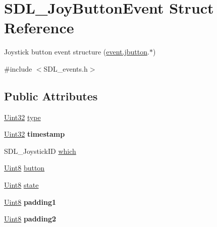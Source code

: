 \hypertarget{structSDL__JoyButtonEvent}{}\section{S\+D\+L\+\_\+\+Joy\+Button\+Event Struct Reference}
\label{structSDL__JoyButtonEvent}


Joystick button event structure (\hyperlink{unionSDL__Event_a591104d64903ae1cf70874fb5d3124ff}{event.\+jbutton}.$\ast$)  




{\ttfamily \#include $<$S\+D\+L\+\_\+events.\+h$>$}

\subsection*{Public Attributes}
\begin{DoxyCompactItemize}
\item 
\hyperlink{SDL__stdinc_8h_add440eff171ea5f55cb00c4a9ab8672d}{Uint32} \hyperlink{structSDL__JoyButtonEvent_a8f3312a046d37fa2884b93f69c4cb655}{type}
\item 
\hypertarget{structSDL__JoyButtonEvent_ab50b6f7d1ab3ac53df69fc2d6cf5fa2a}{}\hyperlink{SDL__stdinc_8h_add440eff171ea5f55cb00c4a9ab8672d}{Uint32} {\bfseries timestamp}\label{structSDL__JoyButtonEvent_ab50b6f7d1ab3ac53df69fc2d6cf5fa2a}

\item 
S\+D\+L\+\_\+\+Joystick\+I\+D \hyperlink{structSDL__JoyButtonEvent_a1679049adad7242b28420948fdc79044}{which}
\item 
\hyperlink{SDL__stdinc_8h_a2944638813a090aa23e62f4da842c3e2}{Uint8} \hyperlink{structSDL__JoyButtonEvent_a73ebe4261cf80564052af9c1af737a4d}{button}
\item 
\hyperlink{SDL__stdinc_8h_a2944638813a090aa23e62f4da842c3e2}{Uint8} \hyperlink{structSDL__JoyButtonEvent_ad3b6f8d9aa2c5e694f664b97d12bcd2b}{state}
\item 
\hypertarget{structSDL__JoyButtonEvent_a3e7ca473fb7783d755d64598529b1ff9}{}\hyperlink{SDL__stdinc_8h_a2944638813a090aa23e62f4da842c3e2}{Uint8} {\bfseries padding1}\label{structSDL__JoyButtonEvent_a3e7ca473fb7783d755d64598529b1ff9}

\item 
\hypertarget{structSDL__JoyButtonEvent_a77a78bee38f4bf0682ccd97bbf8f9ab9}{}\hyperlink{SDL__stdinc_8h_a2944638813a090aa23e62f4da842c3e2}{Uint8} {\bfseries padding2}\label{structSDL__JoyButtonEvent_a77a78bee38f4bf0682ccd97bbf8f9ab9}

\end{DoxyCompactItemize}


